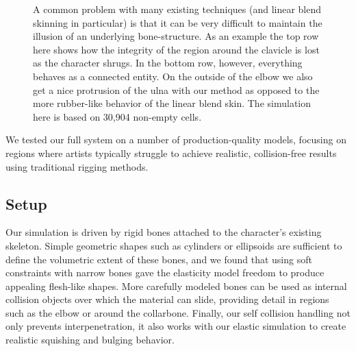 

\begin{figure}[tb]
\vspace{-20pt}
\caption{A common problem with many existing techniques (and linear blend
  skinning in particular) is that it can be very difficult to maintain the
  illusion of an underlying bone-structure. As an example the top row here shows
  how the integrity of the region around the clavicle is lost as the character
  shrugs. In the bottom row, however, everything behaves as a connected
  entity. On the outside of the elbow we also get a nice protrusion of the ulna
  with our method as opposed to the more rubber-like behavior of the linear
  blend skin. The simulation here is based on 30,904 non-empty cells.}
\label{fig:thug}
\vspace{-10pt}
\end{figure}
We tested our full system on a number of production-quality models, focusing on regions where artists typically struggle to achieve realistic, collision-free results using traditional rigging methods.  

\subsection{Setup}
Our simulation is driven by rigid bones attached to the character's existing skeleton.  Simple geometric shapes such as cylinders or ellipsoids are sufficient to define the volumetric extent of these bones, and we found that using soft constraints with narrow bones gave the elasticity model freedom to produce appealing flesh-like shapes. More carefully modeled bones can be used as internal collision objects over which the material can slide, providing detail in regions such as the elbow or around the collarbone. Finally, our self collision handling not only prevents interpenetration, it also works with our elastic simulation to create realistic squishing and bulging behavior.  

